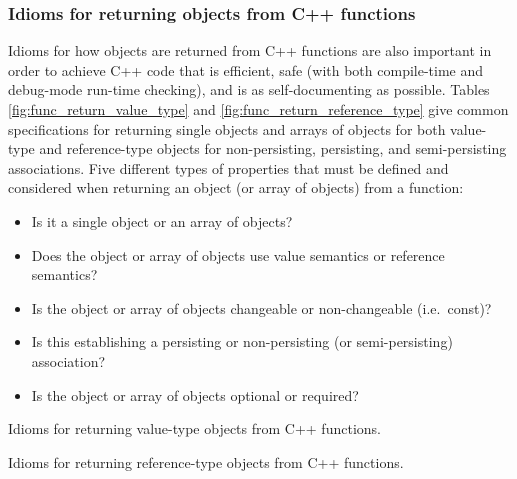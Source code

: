 \documentclass[pdf,ps2pdf,11pt]{SANDreport}
\begin{document}
%
{}\subsubsection{Idioms for returning objects from C++ functions}
\label{sec:idioms-returning-objects}
%

Idioms for how objects are returned from C++ functions are also
important in order to achieve C++ code that is efficient, safe (with
both compile-time and debug-mode run-time checking), and is as
self-documenting as possible.  Tables
{}\ref{fig:func_return_value_type} and
{}\ref{fig:func_return_reference_type} give common specifications for
returning single objects and arrays of objects for both value-type and
reference-type objects for non-persisting, persisting, and
semi-persisting associations.  Five different types of properties that
must be defined and considered when returning an object (or array of
objects) from a function:

\begin{itemize}

{}\item Is it a single object or an array of objects?

{}\item Does the object or array of objects use value semantics or
reference semantics?

{}\item Is the object or array of objects changeable or non-changeable
(i.e.\ const)?

{}\item Is this establishing a persisting or non-persisting (or
semi-persisting) association?

{}\item Is the object or array of objects optional or required?

\end{itemize}


\begin{table}
%
\begin{center}
%
%

%
%
%
\end{center}
\caption{\label{fig:func_return_value_type}
Idioms for returning value-type objects from C++ functions.}
%
\end{table}


\begin{table}
%
\begin{center}
%
%

%
%
%
\end{center}
\caption{\label{fig:func_return_reference_type}
Idioms for returning reference-type objects from C++ functions.}
%
\end{table}
\end{document}
